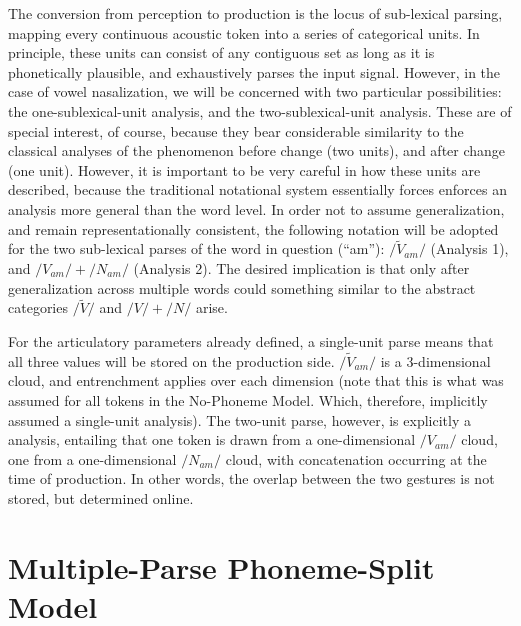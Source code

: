 The conversion from perception to production is the locus of sub-lexical
parsing, mapping every continuous acoustic token into a series of
categorical units. In principle, these units can consist of any contiguous
set as long as it is phonetically plausible, and exhaustively parses
the input signal. However, in the case of vowel nasalization, we will
be concerned with two particular possibilities: the one-sublexical-unit
analysis, and the two-sublexical-unit analysis. These are of special
interest, of course, because they bear considerable similarity to
the classical analyses of the phenomenon before change (two units),
and after change (one unit). However, it is important to be very careful
in how these units are described, because the traditional notational
system essentially forces enforces an analysis more general than the
word level. In order not to assume generalization, and remain representationally
consistent, the following notation will be adopted for the two sub-lexical
parses of the word in question (“am”): $/\tilde{V}_{am}/$ (Analysis
1), and $/V_{am}/+/N_{am}/$ (Analysis 2). The desired implication
is that only after generalization across multiple words could something
similar to the abstract categories $/\widetilde{V}/$ and $/V/+/N/$
arise.

For the articulatory parameters already defined, a single-unit parse
means that all three values will be stored on the production side.
$/\tilde{V}_{am}/$ is a 3-dimensional cloud, and entrenchment applies
over each dimension (note that this is what was assumed for all tokens
in the No-Phoneme Model. Which, therefore, implicitly assumed a single-unit
analysis). The two-unit parse, however, is explicitly a 
analysis, entailing that one token is drawn from a one-dimensional
\emph{$/V_{am}/$} cloud, one from a one-dimensional \emph{$/N_{am}/$}
cloud, with concatenation occurring at the time of production. In
other words, the overlap between the two gestures is not stored, but
determined online. 

\section{Multiple-Parse Phoneme-Split Model}

